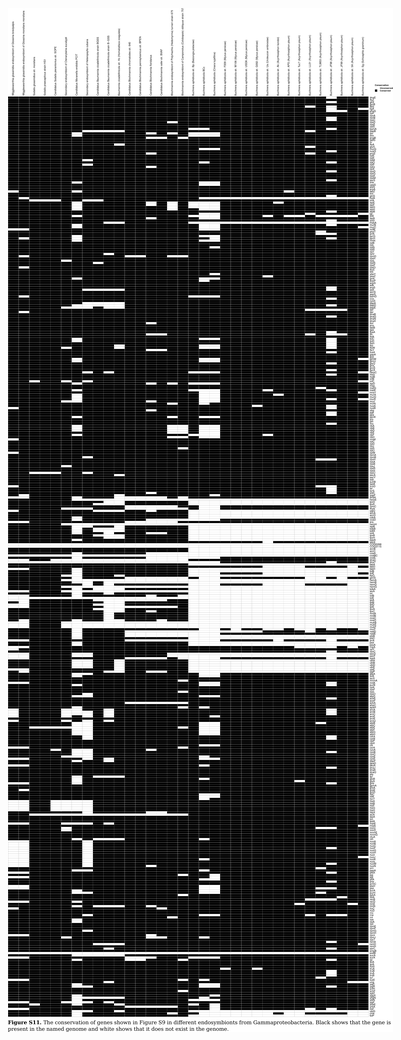 \documentclass{article}
\newcommand{\Newpage}{\end{preview}\begin{preview}}
\begin{document}
\begin{preview}
\includegraphics{suppl11.pdf}
\Newpage

\end{preview}
\end{document}
